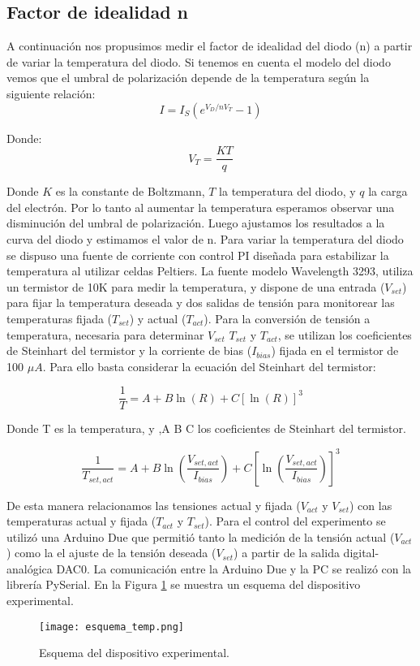 \documentclass[a4paper, 11pt]{article}
\begin{document}
\subsection*{Factor de idealidad n}
A continuación nos propusimos medir el factor de idealidad  del diodo (n) a partir de variar la temperatura del diodo. Si tenemos en cuenta el modelo del diodo vemos que el umbral de polarización depende de la temperatura según la siguiente relación:
\[
I=I_S(e^{V_D/nV_T}-1)
\]

Donde:
\[
V_T=\frac{KT}{q}
\]

Donde $K$ es la constante de Boltzmann, $T$ la temperatura del diodo, y $q$ la carga del electrón. Por lo tanto al aumentar la temperatura esperamos observar una disminución del umbral de polarización. Luego ajustamos los resultados a la curva del diodo y estimamos el valor de n.
Para variar la temperatura del diodo se dispuso una fuente de corriente con control PI diseñada para estabilizar la temperatura al utilizar celdas Peltiers. La fuente modelo Wavelength 3293, utiliza un termistor de 10K para medir la temperatura, y dispone de una entrada ($V_{set}$) para fijar la temperatura deseada y dos salidas de tensión para monitorear las temperaturas fijada ($T_{set}$) y actual ($T_{act}$). Para la conversión de tensión a temperatura, necesaria para determinar $V_{set}$ $T_{set}$ y $T_{act}$, se utilizan los coeficientes de Steinhart del termistor y la corriente de bias ($I_{bias}$) fijada en el termistor  de 100  ${\mu A}$. Para ello basta considerar la ecuación del Steinhart del termistor:

\[
\frac{1}{T} = A + B\ln(R)+ C[\ln(R)]^3
\]

Donde T es la temperatura, y ,A B C los coeficientes de Steinhart del termistor.

\[
\frac{1}{T_{set,act}} = A + B\ln(\frac{V_{set,act}}{I_{bias}})+ C[\ln(\frac{V_{set,act}}{I_{bias}})]^3
\]

De esta manera relacionamos las tensiones actual y fijada ($V_{act}$ y $V_{set}$) con las temperaturas actual y fijada ($T_{act}$ y $T_{set}$). Para el control del experimento se utilizó una Arduino Due que permitió tanto la medición de la tensión actual ($V_{act}$) como la el ajuste de la tensión deseada ($V_{set}$) a partir de la salida digital-analógica DAC0.  La comunicación entre la Arduino Due y la PC se realizó con la librería PySerial. En la Figura \ref{fig:esquema_temp} se muestra un esquema del dispositivo experimental.

\begin{figure} [H]
\centering
\texttt{[image: esquema\_temp.png]}
\caption{ Esquema del dispositivo experimental. \label{fig:esquema_temp}}
\end{figure} 
\end{document}
